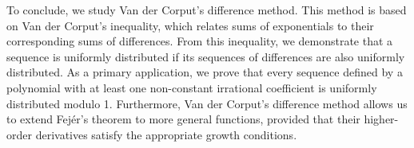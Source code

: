 To conclude, we study Van der Corput's difference method. This method is based on Van der Corput's inequality, which relates sums of exponentials to their corresponding sums of differences. From this inequality, we demonstrate that a sequence is uniformly distributed if its sequences of differences are also uniformly distributed. As a primary application, we prove that every sequence defined by a polynomial with at least one non-constant irrational coefficient is uniformly distributed modulo 1. Furthermore, Van der Corput's difference method allows us to extend Fejér's theorem to more general functions, provided that their higher-order derivatives satisfy the appropriate growth conditions.
